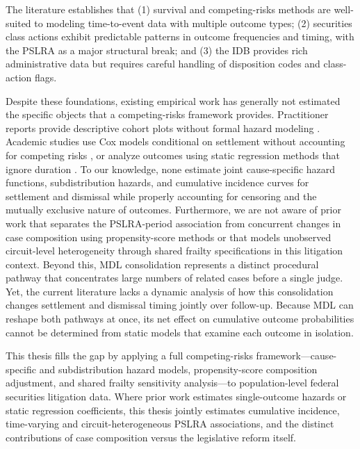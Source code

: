 The literature establishes that (1) survival and
competing-risks methods are well-suited to modeling
time-to-event data with multiple outcome types; (2) securities
class actions exhibit predictable patterns in outcome
frequencies and timing, with the PSLRA as a major structural
break; and (3) the IDB provides rich administrative data but
requires careful handling of disposition codes and class-action
flags.

Despite these foundations, existing empirical work has generally
not estimated the specific objects that a competing-risks
framework provides. Practitioner reports provide descriptive cohort plots
without formal hazard modeling \citep{cornerstone2024}.
Academic studies use Cox models conditional on settlement
without accounting for competing risks \citep{brochet2014},
or analyze outcomes using static regression methods that ignore
duration \citep{cox2008, johnson2007}. To our knowledge, none estimate joint
cause-specific hazard functions, subdistribution hazards, and
cumulative incidence curves for settlement and dismissal while
properly accounting for censoring and the mutually exclusive
nature of outcomes. Furthermore, we are not aware of prior
work that separates the PSLRA-period association from
concurrent changes in case composition using propensity-score
methods or that models unobserved circuit-level heterogeneity
through shared frailty specifications in this litigation
context. Beyond this, MDL consolidation represents a
distinct procedural pathway that concentrates large numbers
of related cases before a single judge. Yet, the current
literature lacks a dynamic analysis of how this consolidation
changes settlement and dismissal timing jointly over
follow-up. Because MDL can reshape both pathways at once,
its net effect on cumulative outcome probabilities cannot be
determined from static models that examine each outcome
in isolation.

This thesis fills the gap by applying a full
competing-risks framework---cause-specific and
subdistribution hazard models, propensity-score composition
adjustment, and shared frailty sensitivity
analysis---to population-level federal securities litigation
data. Where prior work estimates single-outcome hazards or
static regression coefficients, this thesis jointly
estimates cumulative incidence, time-varying and
circuit-heterogeneous PSLRA associations, and the distinct
contributions of case composition versus the legislative
reform itself.
